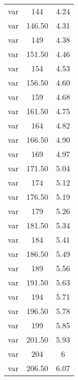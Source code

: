 \begin{center}
\begin{longtable}[h]{ccc}
var & 144 & 4.24 \\

var & 146.50 & 4.31 \\

var & 149 & 4.38 \\

var & 151.50 & 4.46 \\

var & 154 & 4.53 \\

var & 156.50 & 4.60 \\

var & 159 & 4.68 \\

var & 161.50 & 4.75 \\

var & 164 & 4.82 \\

var & 166.50 & 4.90 \\

var & 169 & 4.97 \\

var & 171.50 & 5.04 \\

var & 174 & 5.12 \\

var & 176.50 & 5.19 \\

var & 179 & 5.26 \\

var & 181.50 & 5.34 \\

var & 184 & 5.41 \\

var & 186.50 & 5.49 \\

var & 189 & 5.56 \\

var & 191.50 & 5.63 \\

var & 194 & 5.71 \\

var & 196.50 & 5.78 \\

var & 199 & 5.85 \\

var & 201.50 & 5.93 \\

var & 204 & 6 \\

var & 206.50 & 6.07 \\


\end{longtable}
\end{center}
